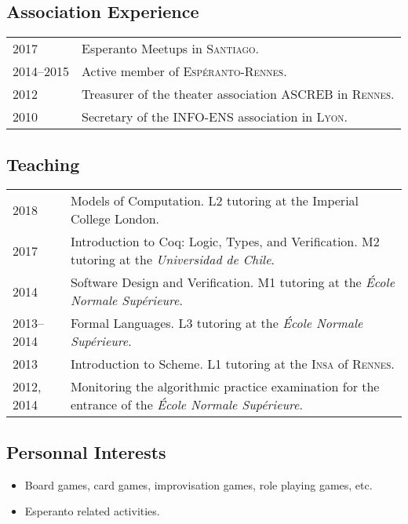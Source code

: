 \documentclass[12pt,a4paper]{article}
\makeatletter
\newcommand{\fr}[1]{\foreignlanguage{french}{\textit{#1}}}
\newcommand{\es}[1]{\foreignlanguage{spanish}{\textit{#1}}}
\newcommand{\fr}[1]{\foreignlanguage{francais}{\textit{#1}}}
\newenvironment{datecvsection}[1]%
               {\subsection*{#1}%
                 \noindent \begin{tabular}{@{}p{\annee}p{\texte}@{}}}
               {\end{tabular}}
\newenvironment{itemcvsection}[1]%
               {\subsection*{#1}\begin{itemize}}
               {\end{itemize}}
\makeatother
\begin{document}
\begin{datecvsection}{Association Experience}

    2017 & Esperanto Meetups in \textsc{Santiago}. \\
    2014–2015 & Active member of \textsc{Espéranto-Rennes}. \\
	2012 & Treasurer of the theater association \textsc{ASCREB} in \textsc{Rennes}. \\
	2010 & Secretary of the \textsc{INFO-ENS} association in \textsc{Lyon}. \\

\end{datecvsection}

\begin{datecvsection}{Teaching}

    2018 & Models of Computation. L2 tutoring at the Imperial College London. \\

    2017 & Introduction to Coq: Logic, Types, and Verification. M2 tutoring at the \es{Universidad de Chile}. \\

    2014 & Software Design and Verification. M1 tutoring at the \fr{École Normale Supérieure}. \\

    2013–2014 & Formal Languages. L3 tutoring at the \fr{École Normale Supérieure}. \\

    2013 & Introduction to Scheme. L1 tutoring at the \textsc{Insa} of \textsc{Rennes}. \\

	2012, 2014 & Monitoring the algorithmic practice examination for the entrance of the \fr{École Normale Supérieure}. \\

\end{datecvsection}

\begin{itemcvsection}{Personnal Interests}

	\item Board games, card games, improvisation games, role playing games, etc.
    \item Esperanto related activities.

\end{itemcvsection}
\end{document}
